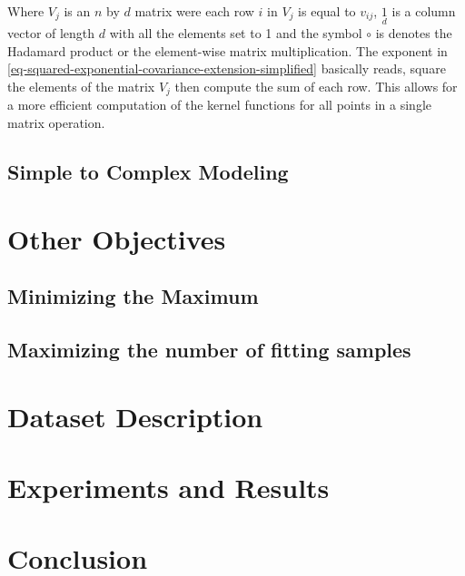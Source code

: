 \documentclass[a4paper,12pt]{article}
\begin{document}
Where $V_{j}$ is an $n$ by $d$ matrix were each row $i$ in $V_{j}$ is equal to $v_{ij}$, $\underset{d}{1}$ is a column vector of length $d$ with all the elements set to 1 and the symbol $\circ$ is denotes the Hadamard product or the element-wise matrix multiplication. The exponent in \eqref{eq-squared-exponential-covariance-extension-simplified} basically reads, square the elements of the matrix $V_{j}$ then compute the sum of each row. This allows for a more efficient computation of the kernel functions for all points in a single matrix operation. 

\subsection{Simple to Complex Modeling}

\section{Other Objectives}
\label{sec-other-objectives}

\subsection{Minimizing the Maximum}
\subsection{Maximizing the number of fitting samples}

\section{Dataset Description}
\label{sec-dataset}

\section{Experiments and Results}
\label{sec-experiment}

\section{Conclusion}
\label{sec-conclusion}
\end{document}
